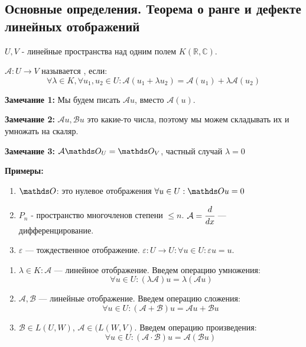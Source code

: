 \subsection{Основные определения. Теорема о ранге и дефекте линейных отображений}

 $U,V$ - линейные пространства над одним полем $K(\mathbb{R}, \mathbb{C})$.

$\mathcal{A}: U\rightarrow V$ называется , если: 
$$\forall \lambda \in K,\forall u_1, u_2 \in U: \mathcal{A}(u_1 + \lambda u_2) = \mathcal{A} (u_1) + \lambda\mathcal{A}(u_2)$$

\textbf{Замечание 1:} Мы будем писать $\mathcal{A} u$, вместо $\mathcal{A}(u)$.

\textbf{Замечание 2:} $\mathcal{A}u, \mathcal{B}u$ это какие-то числа, поэтому мы можем складывать их и умножать на скаляр.

\textbf{Замечание 3:} $\mathcal{A} \zero_U = \zero_V$, частный случай $\lambda = 0$

\textbf{Примеры:}
\begin{enumerate}
    \item $\zero$: это нулевое отображения $\forall u \in U: \zero u = 0$ 

     \item $P_n$ - пространство многочленов степени $\leq n$. $\mathcal{A}=\cfrac{d}{dx}$ --- дифференцирование.

    \item $\varepsilon$ --- тождественное отображение. $\varepsilon: U\rightarrow U:\forall u\in U: \varepsilon u = u$.
\end{enumerate}


\begin{enumerate}
    \item $\lambda \in K: \mathcal{A}$ --- линейное отображение. Введем операцию умножения:
$$\ \forall u \in U: (\lambda\mathcal{A}) u = \lambda(\mathcal{A} u)$$
    \item $\mathcal{A}, \mathcal{B}$ --- линейные отображение. Введем операцию сложения: 
    $$ \forall u \in U:(\mathcal{A} + \mathcal{B}) u = \mathcal{A}u + \mathcal{B}u $$
    

    \item  $\mathcal{B}\in L(U,W)$, $\mathcal{A} \in (L(W,V)$. Введем операцию произведения:
    $$\forall u \in U:(\mathcal{A} \cdot \mathcal{B}) u = \mathcal{A}(\mathcal{B}u)$$
    
\end{enumerate}


